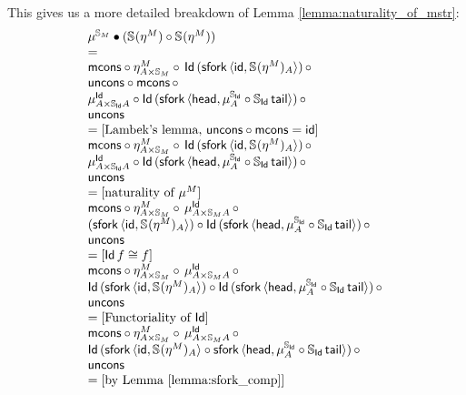 \documentclass{article}
\begin{document}
This gives us a more detailed breakdown of Lemma \ref{lemma:naturality_of_mstr}:
$$
\begin{array}{ll}
	\mu^{\stream{M}} \bullet (\stream{}(\eta^M) \comp \stream{}(\eta^M)) \\
	= \\
	\mcons \circ \eta^M_{A \times \stream{M}} \circ\, \Id\,(\sfork\,\pair{\id}{\stream{}(\eta^M)_A})\, \circ\, \\ 
	 \uncons \circ \mcons\, \circ\, \\
	 \mu^\Id_{A \times \stream{\Id}A} \circ \Id\,(\sfork\,\pair{\head}{\mu^{\stream{\Id}}_A \comp \stream{\Id}\,\tail})\, \circ\, \\
	 \uncons \\
	 = \text{[Lambek's lemma, $\uncons \circ \mcons = \id$]}\\
	\mcons \circ \eta^M_{A \times \stream{M}} \circ\, \Id\,(\sfork\,\pair{\id}{\stream{}(\eta^M)_A})\, \circ\, \\ 
	 \mu^\Id_{A \times \stream{\Id}A} \circ \Id\,(\sfork\,\pair{\head}{\mu^{\stream{\Id}}_A \comp \stream{\Id}\,\tail})\, \circ\, \\
	 \uncons \\
	 = \text{[naturality of $\mu^M$]}\\
	\mcons \circ \eta^M_{A \times \stream{M}} \circ\, \mu^\Id_{A \times \stream{M}A}\, \circ\, \\ 
	 (\sfork\,\pair{\id}{\stream{}(\eta^M)_A}) \circ \Id\,(\sfork\,\pair{\head}{\mu^{\stream{\Id}}_A \comp \stream{\Id}\,\tail})\, \circ\, \\
	 \uncons \\
	 = \text{[$\Id\,f \cong f$]}\\
	\mcons \circ \eta^M_{A \times \stream{M}} \circ\, \mu^\Id_{A \times \stream{M}A}\, \circ\, \\ 
	 \Id\,(\sfork\,\pair{\id}{\stream{}(\eta^M)_A}) \circ \Id\,(\sfork\,\pair{\head}{\mu^{\stream{\Id}}_A \comp \stream{\Id}\,\tail})\, \circ\, \\
	 \uncons \\
	 = \text{[Functoriality of $\Id$]}\\
	 \mcons \circ \eta^M_{A \times \stream{M}} \circ\, \mu^\Id_{A \times \stream{M}A}\, \circ\, \\ 
	 \Id\,(\sfork\,\pair{\id}{\stream{}(\eta^M)_A} \circ \sfork\,\pair{\head}{\mu^{\stream{\Id}}_A \comp \stream{\Id}\,\tail})\, \circ\, \\
	 \uncons \\
	 = \text{[by Lemma \ref{lemma:sfork_comp}]}\\

\end{array}$$
\end{document}
